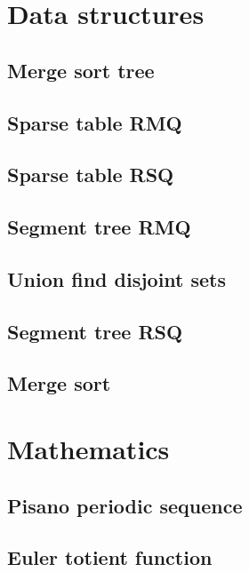 \section{Data structures}
\subsection{Merge sort tree}
\raggedbottom
\hrulefill
\subsection{Sparse table RMQ}
\raggedbottom
\hrulefill
\subsection{Sparse table RSQ}
\raggedbottom
\hrulefill
\subsection{Segment tree RMQ}
\raggedbottom
\hrulefill
\subsection{Union find disjoint sets}
\raggedbottom
\hrulefill
\subsection{Segment tree RSQ}
\raggedbottom
\hrulefill
\subsection{Merge sort}
\raggedbottom
\hrulefill


\section{Mathematics}
\subsection{Pisano periodic sequence}
\raggedbottom
\hrulefill
\subsection{Euler totient function}
\raggedbottom
\hrulefill
